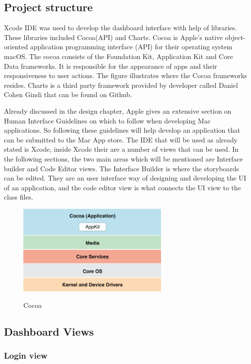 \subsection{Project structure}

Xcode IDE was used to develop the dashboard interface with help of libraries. These libraries included Cocoa(API) and Charts. Cocoa is Apple's native object-oriented application programming interface (API) for their operating system macOS. The cocoa consists of the Foundation Kit, Application Kit and Core Data frameworks. It is responsible for the appearance of apps and their responsiveness to user actions. The figure illustrates where the Cocoa frameworks resides. Charts is a third party framework provided by developer called Daniel Cohen Gindi that can be found on Github. \cite{charts} 

Already discussed in the design chapter, Apple gives an extensive section on Human Interface Guidelines on which to follow when developing Mac applications. So following these guidelines will help develop an application that can be submitted to the Mac App store. The IDE that will be used as already stated is Xcode, inside Xcode their are a number of views that can be used. In the following sections, the two main areas which will be mentioned are Interface builder and Code Editor views. The Interface Builder is where the storyboards can be edited. They are an user interface way of designing and developing the UI of an application, and the code editor view is what connects the UI view to the class files.

\begin{figure}[!h]
    \caption{Cocoa \cite{cocoa}}
    \centering
    \includegraphics[width=75mm]{images/dashboard/cocoa}
    \label{fig:apns}
\end{figure}

\subsection{Dashboard Views}

\subsubsection{Login view}

